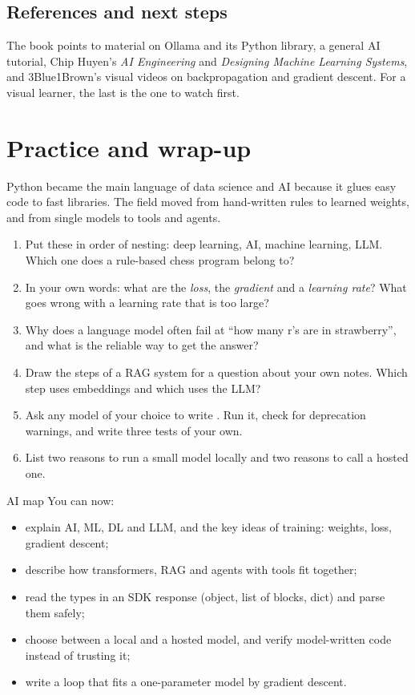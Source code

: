 \subsection{References and next steps}

The book points to material on Ollama and its Python library, a general AI tutorial, Chip Huyen's
\emph{AI Engineering} and \emph{Designing Machine Learning Systems}, and 3Blue1Brown's visual
videos on backpropagation and gradient descent. For a visual learner, the last is the one to
watch first.

\section{Practice and wrap-up}

Python became the main language of data science and AI because it glues easy code to fast
libraries. The field moved from hand-written rules to learned weights, and from single models to
tools and agents.

\begin{practice}
\begin{enumerate}[leftmargin=*]
\item Put these in order of nesting: deep learning, AI, machine learning, LLM. Which one does a
rule-based chess program belong to?
\item In your own words: what are the \emph{loss}, the \emph{gradient} and a \emph{learning rate}?
What goes wrong with a learning rate that is too large?
\item Why does a language model often fail at ``how many r's are in strawberry'', and what is the
reliable way to get the answer?
\item Draw the steps of a RAG system for a question about your own notes. Which step uses
embeddings and which uses the LLM?
\item Ask any model of your choice to write . Run it, check for deprecation
warnings, and write three tests of your own.
\item List two reasons to run a small model locally and two reasons to call a hosted one.
\end{enumerate}
\end{practice}

\begin{achievement}{AI map}
You can now:
\begin{itemize}[leftmargin=*]
\item explain AI, ML, DL and LLM, and the key ideas of training: weights, loss, gradient descent;
\item describe how transformers, RAG and agents with tools fit together;
\item read the types in an SDK response (object, list of blocks, dict) and parse them safely;
\item choose between a local and a hosted model, and verify model-written code instead of trusting it;
\item write a loop that fits a one-parameter model by gradient descent.
\end{itemize}
\end{achievement}
